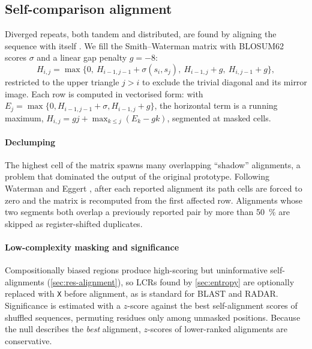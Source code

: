 \documentclass[11pt,a4paper]{article}
\newcommand{\seq}[1]{\texttt{#1}}
\begin{document}
\subsection{Self-comparison alignment}\label{sec:alignment}
Diverged repeats, both tandem and distributed, are found by aligning the sequence with itself
\cite{gibbs1970diagonal,heger2000radar,szklarczyk2004trust}. We fill the Smith--Waterman matrix
\cite{smith1981identification} with BLOSUM62 scores $\sigma$ \cite{henikoff1992blosum} and a linear gap
penalty $g=-8$:
\begin{equation}
  H_{i,j} = \max\{0,\ H_{i-1,j-1}+\sigma(s_i,s_j),\ H_{i-1,j}+g,\ H_{i,j-1}+g\},
\end{equation}
restricted to the upper triangle $j>i$ to exclude the trivial diagonal and its mirror image. Each row is computed in vectorised form:
with $E_j = \max\{0, H_{i-1,j-1}+\sigma, H_{i-1,j}+g\}$, the horizontal term is a running maximum,
$H_{i,j} = gj + \max_{k\le j}(E_k - gk)$, segmented at masked cells.

\paragraph{Declumping} The highest cell of the matrix spawns many overlapping ``shadow'' alignments, a problem
that dominated the output of the original prototype. Following Waterman and Eggert \cite{waterman1987eggert},
after each reported alignment its path cells are forced to zero and the matrix is recomputed from the first
affected row. Alignments whose two segments both overlap a previously reported pair by more than
\SI{50}{\percent} are skipped as register-shifted duplicates.

\paragraph{Low-complexity masking and significance} Compositionally biased regions produce high-scoring but
uninformative self-alignments (\cref{sec:res-alignment}), so LCRs found by \cref{sec:entropy} are optionally
replaced with \seq{X} before alignment, as is standard for BLAST and RADAR. Significance is estimated with a
$z$-score against the best self-alignment scores of \nShuffles{} shuffled sequences, permuting residues only
among unmasked positions. Because the null describes the \emph{best} alignment, $z$-scores of lower-ranked
alignments are conservative.
\end{document}
